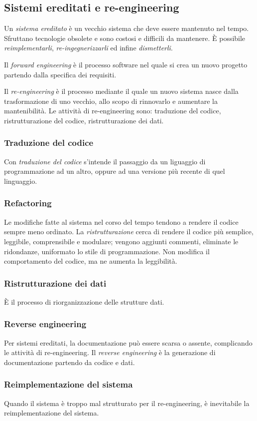 \documentclass[11pt]{article}
\begin{document}
\subsection{Sistemi ereditati e re-engineering}
Un \textit{sistema ereditato} è un vecchio sistema che deve essere mantenuto nel tempo. Sfruttano tecnologie obsolete e 
sono costosi e difficili da mantenere.
È possibile \textit{reimplementarli}, \textit{re-ingegnerizzarli} ed infine \textit{dismetterli}.

Il \textit{forward engineering} è il processo software nel quale si crea un nuovo progetto partendo dalla specifica dei 
requisiti.

Il \textit{re-engineering} è il processo mediante il quale un nuovo sistema nasce dalla trasformazione di uno vecchio, allo 
scopo di rinnovarlo e aumentare la mantenibilità. Le attività di re-engineering sono: traduzione del codice, ristrutturazione 
del codice, ristrutturazione dei dati.
\subsubsection*{Traduzione del codice}
Con \textit{traduzione del codice} s'intende il passaggio da un liguaggio di programmazione ad un altro, oppure ad una 
versione più recente di quel linguaggio.
\subsubsection*{Refactoring}
Le modifiche fatte al sistema nel corso del tempo tendono a rendere il codice sempre meno ordinato. La \textit{ristrutturazione}
cerca di rendere il codice più semplice, leggibile, comprensibile e modulare; vengono aggiunti commenti, eliminate le 
ridondanze, uniformato lo stile di programmazione. Non modifica il comportamento del codice, ma ne aumenta la leggibilità.
\subsubsection*{Ristrutturazione dei dati}
È il processo di riorganizzazione delle strutture dati.
\subsubsection*{Reverse engineering}
Per sistemi ereditati, la documentazione può essere scarsa o assente, complicando le attività di re-engineering. 
Il \textit{reverse engineering} è la generazione di documentazione partendo da codice e dati.
\subsubsection*{Reimplementazione del sistema}
Quando il sistema è troppo mal strutturato per il re-engineering, è inevitabile la reimplementazione del sistema. 
\end{document}
